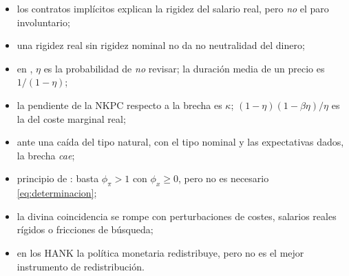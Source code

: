 \documentclass[11pt]{article}
\begin{document}
\begin{itemize}
\begin{itemize}
  \item los contratos implícitos explican la rigidez del salario real, pero \emph{no} el paro involuntario;
  \item una rigidez real sin rigidez nominal no da no neutralidad del dinero;
  \item en , $\eta$ es la probabilidad de \emph{no} revisar; la duración media de un precio es $1/(1-\eta)$;
  \item la pendiente de la NKPC respecto a la brecha es $\kappa$; $(1-\eta)(1-\beta\eta)/\eta$ es la del coste marginal real;
  \item ante una caída del tipo natural, con el tipo nominal y las expectativas dados, la brecha \emph{cae};
  \item principio de : basta $\phi_\pi>1$ con $\phi_x\geq0$, pero no es necesario \eqref{eq:determinacion};
  \item la divina coincidencia se rompe con perturbaciones de costes, salarios reales rígidos o fricciones de búsqueda;
  \item en los HANK la política monetaria redistribuye, pero no es el mejor instrumento de redistribución.
  \end{itemize}
\end{itemize}

\nocite{CuerpoQuesada2016}
\bibliografia
\end{document}
